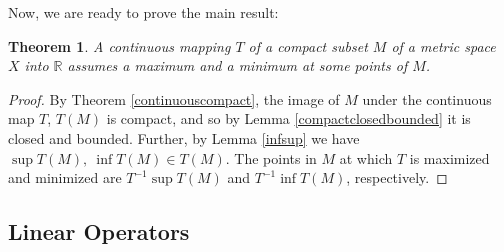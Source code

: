 \documentclass[11pt]{article}
\theoremstyle{mystyle}
\newtheorem{thm}{Theorem}[section]
\newcommand{\0}{\mathbf{0}}
\begin{document}
Now, we are ready to prove the main result:
\begin{thm}
A continuous mapping $T$ of a compact subset $M$ of a metric space $X$ into $\mathbb{R}$ assumes a maximum and a minimum at some points of $M$.
\end{thm}
\begin{proof}
By Theorem \ref{continuouscompact}, the image of $M$ under the continuous map $T$, $T(M)$ is compact, and so by Lemma \ref{compactclosedbounded} it is closed and bounded. Further, by Lemma \ref{infsup} we have $\sup T(M), \ \inf T(M) \in T(M)$. The points in $M$ at which $T$ is maximized and minimized are $T^{-1}\sup T(M)$ and $T^{-1}\inf T(M)$, respectively.
\end{proof}

\subsection{Linear Operators}
\end{document}
